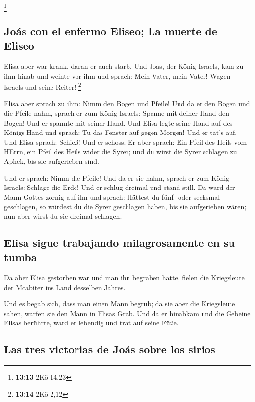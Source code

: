 \footnote{\textbf{13:13} 2Kö 14,23}

\hypertarget{jouxe1s-con-el-enfermo-eliseo-la-muerte-de-eliseo}{%
\subsection{Joás con el enfermo Eliseo; La muerte de
Eliseo}\label{jouxe1s-con-el-enfermo-eliseo-la-muerte-de-eliseo}}

 Elisa aber war krank, daran er auch starb. Und Joas, der
König Israels, kam zu ihm hinab und weinte vor ihm und sprach: Mein
Vater, mein Vater! Wagen Israels und seine Reiter! \footnote{\textbf{13:14}
  2Kö 2,12}

 Elisa aber sprach zu ihm: Nimm den Bogen und Pfeile! Und
da er den Bogen und die Pfeile nahm,  sprach er zum König
Israels: Spanne mit deiner Hand den Bogen! Und er spannte mit seiner
Hand. Und Elisa legte seine Hand auf des Königs Hand  und
sprach: Tu das Fenster auf gegen Morgen! Und er tat's auf. Und Elisa
sprach: Schieß! Und er schoss. Er aber sprach: Ein Pfeil des Heils vom
HErrn, ein Pfeil des Heils wider die Syrer; und du wirst die Syrer
schlagen zu Aphek, bis sie aufgerieben sind.

 Und er sprach: Nimm die Pfeile! Und da er sie nahm,
sprach er zum König Israels: Schlage die Erde! Und er schlug dreimal und
stand still.  Da ward der Mann Gottes zornig auf ihn und
sprach: Hättest du fünf- oder sechsmal geschlagen, so würdest du die
Syrer geschlagen haben, bis sie aufgerieben wären; nun aber wirst du sie
dreimal schlagen.

\hypertarget{elisa-sigue-trabajando-milagrosamente-en-su-tumba}{%
\subsection{Elisa sigue trabajando milagrosamente en su
tumba}\label{elisa-sigue-trabajando-milagrosamente-en-su-tumba}}

 Da aber Elisa gestorben war und man ihn begraben hatte,
fielen die Kriegsleute der Moabiter ins Land desselben Jahres.

 Und es begab sich, dass man einen Mann begrub; da sie
aber die Kriegsleute sahen, warfen sie den Mann in Elisas Grab. Und da
er hinabkam und die Gebeine Elisas berührte, ward er lebendig und trat
auf seine Füße.

\hypertarget{las-tres-victorias-de-jouxe1s-sobre-los-sirios}{%
\subsection{Las tres victorias de Joás sobre los
sirios}\label{las-tres-victorias-de-jouxe1s-sobre-los-sirios}}

